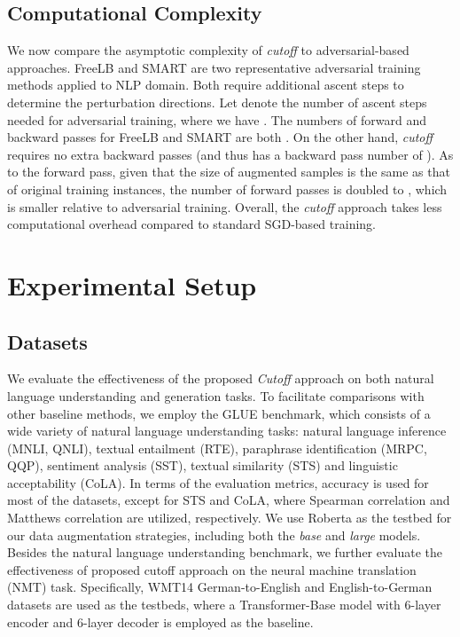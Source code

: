 \documentclass[11pt,a4paper]{article}
\begin{document}
\subsection{Computational Complexity}
\label{sec:computation}
We now compare the asymptotic complexity of \emph{cutoff} to adversarial-based approaches. FreeLB \cite{zhu2019freelb} and SMART \cite{jiang2019smart} are two representative adversarial training methods applied to NLP domain. Both require additional ascent steps to determine the perturbation directions. Let  denote the number of ascent steps needed for adversarial training, where we have . The numbers of forward and backward passes for FreeLB and SMART are both . On the other hand, \emph{cutoff} requires no extra backward passes (and thus has a backward pass number of ). As to the forward pass, given that the size of augmented samples is the same as that of original training instances, the number of forward passes is doubled to , which is smaller relative to adversarial training. Overall, the \emph{cutoff} approach takes less computational overhead compared to standard SGD-based training.

\section{Experimental Setup}
\subsection{Datasets}
We evaluate the effectiveness of the proposed \emph{Cutoff} approach on both natural language understanding and generation tasks.
To facilitate comparisons with other baseline methods, we employ the GLUE benchmark, which consists of a wide variety of natural language understanding tasks: natural language inference (MNLI, QNLI), textual entailment (RTE), paraphrase identification (MRPC, QQP), sentiment analysis (SST), textual similarity (STS) and linguistic acceptability (CoLA). In terms of the evaluation metrics, accuracy is used for most of the datasets, except for STS and CoLA, where Spearman correlation and Matthews correlation are utilized, respectively. We use Roberta \cite{liu2019roberta} as the testbed for our data augmentation strategies, including both the \emph{base} and \emph{large} models.
Besides the natural language understanding benchmark, we further evaluate the effectiveness of proposed cutoff approach on the neural machine translation (NMT) task. Specifically, WMT14 German-to-English and English-to-German datasets are used as the testbeds, where a Transformer-Base model with 6-layer encoder and 6-layer decoder is employed as the baseline.
\end{document}
